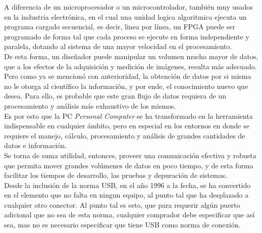 A diferencia de un microprocesador o un microcontrolador, también muy usados en la industria electrónica, en el cual una unidad logica algoritmica ejecuta un programa cargado secuencial, es decir, linea por línea, un FPGA puede ser programado de forma tal que cada proceso se ejecute en forma independiente y paralela, dotando al sistema de una mayor velocidad en el procesamiento.\\

De esta forma, un diseñador puede manipular un volumen mucho mayor de datos, que a los efectos de la adquisición y medición de imágenes, resulta más adecuado.\\

Pero como ya se mencionó con anterioridad, la obtención de datos por si misma no le otorga al científico la información, y por ende, el conocimiento nuevo que desea. Para ello, es probable que este gran flujo de datos requiera de un procesamiento y análisis más exhaustivo de los mismos.\\

Es por esto que la PC {\it Personal Computer} se ha transformado en la herramienta indispensable en cualquier ámbito, pero en especial en los entornos en donde se requiere el  manejo, cálculo, procesamiento y análisis de grandes cantidades de datos e información.\\

Se torna de suma utilidad, entonces, proveer una comunicación efectiva y robusta que permita mover grandes volúmenes de datos en poco tiempo, y de esta forma facilitar los tiempos de desarrollo, las pruebas y depuración de sistemas.\\

Desde la inclusión de la norma USB, en el año 1996 a la fecha, se ha convertido en el elemento que no falta en ningun equipo, al punto tal que ha desplazado a cualquier otro conector. Al punto tal es esto, que para requerir algún puerto adicional que no sea de esta norma, cualquier comprador debe especificar que así sea, mas no es necesario especificar que tiene USB como norma de conexión.\\

